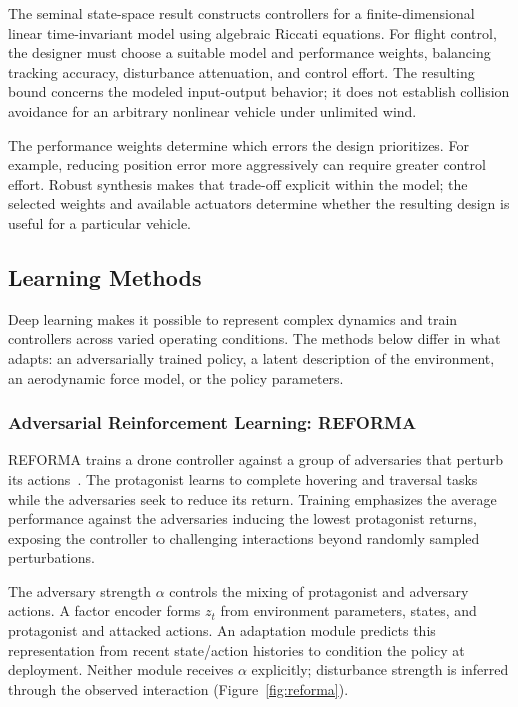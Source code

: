 The seminal state-space result constructs controllers for a finite-dimensional linear time-invariant model using algebraic Riccati equations. For flight control, the designer must choose a suitable model and performance weights, balancing tracking accuracy, disturbance attenuation, and control effort. The resulting bound concerns the modeled input-output behavior; it does not establish collision avoidance for an arbitrary nonlinear vehicle under unlimited wind.

The performance weights determine which errors the design prioritizes. For example, reducing position error more aggressively can require greater control effort. Robust synthesis makes that trade-off explicit within the model; the selected weights and available actuators determine whether the resulting design is useful for a particular vehicle.

\subsection{Learning Methods}
Deep learning makes it possible to represent complex dynamics and train controllers across varied operating conditions. The methods below differ in what adapts: an adversarially trained policy, a latent description of the environment, an aerodynamic force model, or the policy parameters.

\FloatBarrier
\subsubsection{Adversarial Reinforcement Learning: REFORMA}
REFORMA trains a drone controller against a group of adversaries that perturb its actions~\cite{litREFORMA2024}. The protagonist learns to complete hovering and traversal tasks while the adversaries seek to reduce its return. Training emphasizes the average performance against the adversaries inducing the lowest protagonist returns, exposing the controller to challenging interactions beyond randomly sampled perturbations.

The adversary strength $\alpha$ controls the mixing of protagonist and adversary actions. A factor encoder forms $z_t$ from environment parameters, states, and protagonist and attacked actions. An adaptation module predicts this representation from recent state/action histories to condition the policy at deployment. Neither module receives $\alpha$ explicitly; disturbance strength is inferred through the observed interaction (Figure~\ref{fig:reforma}).

